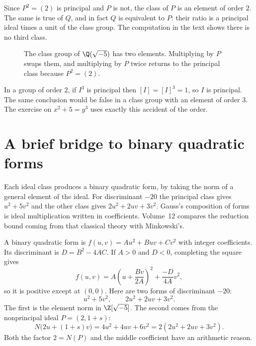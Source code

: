 \begin{examplex}
Since $P^2=(2)$ is principal and $P$ is not, the class of $P$ is an element of order $2$. The same is true of $Q$, and in fact $Q$ is equivalent to $P$: their ratio is a principal ideal times a unit of the class group. The computation in the text shows there is no third class.
\end{examplex}

\begin{figure}[ht]
\centering
{}
\caption{The class group of $\Q(\sqrt{-5})$ has two elements. Multiplying by $P$ swaps them, and multiplying by $P$ twice returns to the principal class because $P^2=(2)$.}
\label{fig:t1-classes}
\end{figure}

\begin{examplex}
In a group of order $2$, if $I^3$ is principal then $[I]=[I]^3=1$, so $I$ is principal. The same conclusion would be false in a class group with an element of order $3$. The exercise on $x^2+5=y^3$ uses exactly this accident of the order.
\end{examplex}

\section{A brief bridge to binary quadratic forms}

Each ideal class produces a binary quadratic form, by taking the norm of a general element of the ideal. For discriminant $-20$ the principal class gives $u^2+5v^2$ and the other class gives $2u^2+2uv+3v^2$. Gauss's composition of forms is ideal multiplication written in coefficients. Volume~12 compares the reduction bound coming from that classical theory with Minkowski's.

A binary quadratic form is $f(u,v)=Au^2+Buv+Cv^2$ with integer
coefficients. Its discriminant is $D=B^2-4AC$.
If $A>0$ and $D<0$, completing the square gives
\[
f(u,v)=A\left(u+\frac{Bv}{2A}\right)^2
       +\frac{-D}{4A}v^2,
\]
so it is positive except at $(0,0)$.
Here are two forms of discriminant $-20$:
\[
u^2+5v^2,\qquad 2u^2+2uv+3v^2.
\]
The first is the element norm in $\Z[\sqrt{-5}]$.
The second comes from the nonprincipal ideal $P=(2,1+s)$:
\[
N\bigl(2u+(1+s)v\bigr)
=4u^2+4uv+6v^2=2(2u^2+2uv+3v^2).
\]
Both the factor $2=N(P)$ and the middle coefficient have an arithmetic reason.

